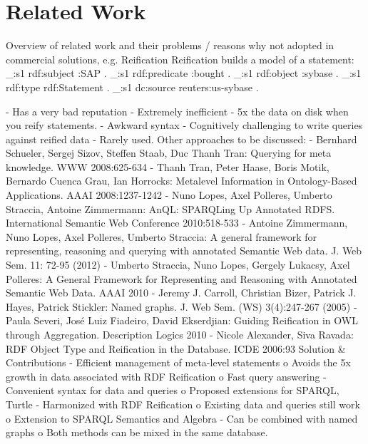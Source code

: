 \section{Related Work}
Overview of related work and their problems / reasons why not adopted in commercial solutions, e.g. 
Reification
Reification builds a model of a statement:
\_:s1 rdf:subject   :SAP .
\_:s1 rdf:predicate :bought .
\_:s1 rdf:object    :sybase .
\_:s1 rdf:type      rdf:Statement .
\_:s1 dc:source     reuters:us-sybase .

-	Has a very bad reputation
-	Extremely inefficient 
-	5x the data on disk when you reify statements.
-	Awkward syntax
-	Cognitively challenging to write queries against reified data
-	Rarely used.
Other approaches to be discussed:
-	Bernhard Schueler, Sergej Sizov, Steffen Staab, Duc Thanh Tran: Querying for meta knowledge. WWW 2008:625-634
-	Thanh Tran, Peter Haase, Boris Motik, Bernardo Cuenca Grau, Ian Horrocks: Metalevel Information in Ontology-Based Applications. AAAI 2008:1237-1242
-	Nuno Lopes, Axel Polleres, Umberto Straccia, Antoine Zimmermann: AnQL: SPARQLing Up Annotated RDFS. International Semantic Web Conference 2010:518-533
-	Antoine Zimmermann, Nuno Lopes, Axel Polleres, Umberto Straccia: A general framework for representing, reasoning and querying with annotated Semantic Web data. J. Web Sem. 11: 72-95 (2012)
-	Umberto Straccia, Nuno Lopes, Gergely Lukacsy, Axel Polleres: A General Framework for Representing and Reasoning with Annotated Semantic Web Data. AAAI 2010
-	Jeremy J. Carroll, Christian Bizer, Patrick J. Hayes, Patrick Stickler: Named graphs. J. Web Sem. (WS) 3(4):247-267 (2005)
-	Paula Severi, Jos{\'e} Luiz Fiadeiro, David Ekserdjian: Guiding Reification in OWL through Aggregation. Description Logics 2010
-	Nicole Alexander, Siva Ravada: RDF Object Type and Reification in the Database. ICDE 2006:93
Solution \& Contributions
-	Efficient management of meta-level statements 
o	Avoids the 5x growth in data associated with RDF Reification
o	Fast query answering
-	Convenient syntax for data and queries
o	Proposed extensions for SPARQL, Turtle
-	Harmonized with RDF Reification
o	Existing data and queries still work
o	Extension to SPARQL Semantics and Algebra
-	Can be combined with named graphs
o	Both methods can be mixed in the same database.


